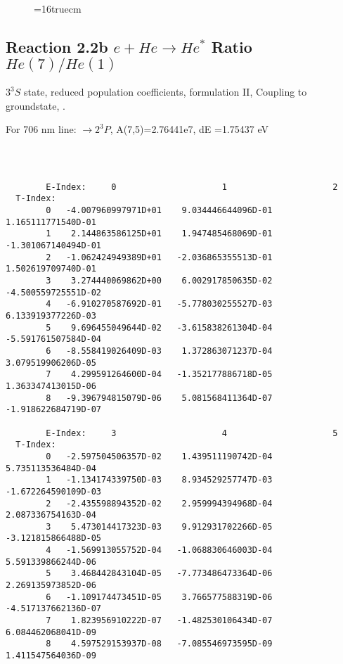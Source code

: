 \documentclass[12pt,dvipdfmx]{article}
\begin{document}
\begin{figure} \label{2.2a}
\epsfxsize=16truecm
\end{figure}
\newpage


\subsection{
  Reaction 2.2b $e + He \rightarrow He^*  $ Ratio $He(7)/He(1)$
}

  $3^3S$ state,
  reduced population coefficients, formulation II,
  Coupling to groundstate, \cite{kn:Fujimoto}.

  For 706 nm line: $\rightarrow 2^3P$, A(7,5)=2.76441e7, dE =1.75437 eV

\begin{small}\begin{verbatim}



        E-Index:     0                     1                     2
  T-Index:
        0   -4.007960997971D+01    9.034446644096D-01    1.165111771540D-01
        1    2.144863586125D+01    1.947485468069D-01   -1.301067140494D-01
        2   -1.062424949389D+01   -2.036865355513D-01    1.502619709740D-01
        3    3.274440069862D+00    6.002917850635D-02   -4.500559725551D-02
        4   -6.910270587692D-01   -5.778030255527D-03    6.133919377226D-03
        5    9.696455049644D-02   -3.615838261304D-04   -5.591761507584D-04
        6   -8.558419026409D-03    1.372863071237D-04    3.079519906206D-05
        7    4.299591264600D-04   -1.352177886718D-05    1.363347413015D-06
        8   -9.396794815079D-06    5.081568411364D-07   -1.918622684719D-07

        E-Index:     3                     4                     5
  T-Index:
        0   -2.597504506357D-02    1.439511190742D-04    5.735113536484D-04
        1   -1.134174339750D-03    8.934529257747D-03   -1.672264590109D-03
        2   -2.435598894352D-02    2.959994394968D-04    2.087336754163D-04
        3    5.473014417323D-03    9.912931702266D-05   -3.121815866488D-05
        4   -1.569913055752D-04   -1.068830646003D-04    5.591339866244D-06
        5    3.468442843104D-05   -7.773486473364D-06    2.269135973852D-06
        6   -1.109174473451D-05    3.766577588319D-06   -4.517137662136D-07
        7    1.823956910222D-07   -1.482530106434D-07    6.084462068041D-09
        8    4.597529153937D-08   -7.085546973595D-09    1.411547564036D-09


\end{verbatim}
\end{small}
\end{document}
